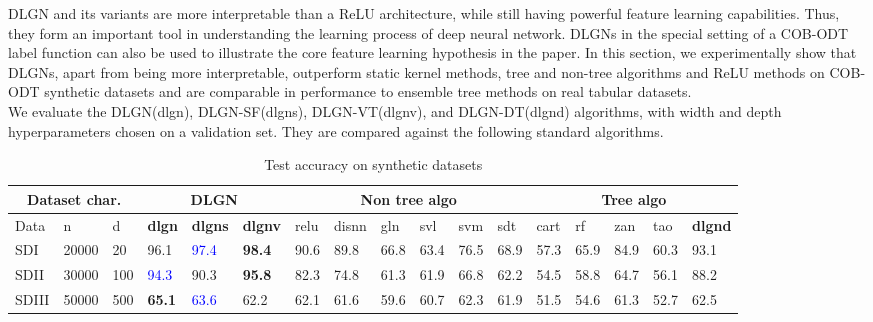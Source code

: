 \documentclass{article} %
\renewcommand{\>}{{\rightarrow}}
\renewcommand{\=}{\stackrel{\triangle}{=}}
\newcommand{\0}{{\mathbf 0}}
\begin{document}
DLGN and its variants are more interpretable than a ReLU architecture, while still having powerful feature learning capabilities. Thus, they form an important tool in understanding the learning process of deep neural network. DLGNs in the special setting of a COB-ODT label function can also be used to illustrate the core feature learning hypothesis in the paper. In this section, we experimentally show that DLGNs, apart from being more interpretable, outperform static kernel methods, tree and non-tree algorithms and ReLU methods on COB-ODT synthetic datasets and are comparable in performance to ensemble tree methods on real tabular datasets. \\

We evaluate the DLGN(dlgn), DLGN-SF(dlgns), DLGN-VT(dlgnv), and DLGN-DT(dlgnd) algorithms, with width and depth hyperparameters chosen on a validation set. They are compared against the following standard algorithms. 

\begin{table}[t]
\caption{Test accuracy on synthetic datasets}
\label{acc-cob-odts}
\begin{center}
\small
\begin{adjustbox}{width=0.99 \textwidth}
\begin{tabular}{|p{0.52cm}|p{0.6cm}|p{0.3cm}|p{0.4cm}|p{0.55cm}|p{0.55cm}|p{0.4cm}|p{0.5cm}|p{0.4cm}|p{0.4cm}|p{0.4cm}|p{0.4cm}|p{0.4cm}|p{0.4cm}|p{0.4cm}|p{0.4cm}|p{0.6cm}|}
\hline
\multicolumn{3}{|c|}{Dataset char.} &\multicolumn{3}{|c|}{DLGN} &\multicolumn{6}{|c|}{Non tree algo} &\multicolumn{5}{|c|}{Tree algo} \\
 \hline
 Data &n &d &\textbf{dlgn} &\textbf{dlgns} &\textbf{dlgnv} &relu &disnn &gln &svl &svm &sdt &cart &rf &zan &tao &\textbf{dlgnd}
\\ \hline
SDI    &20000 &20 &96.1 &\textcolor{blue}{97.4} &\textbf{98.4} &90.6 &89.8 &66.8 &63.4 &76.5 &68.9  &57.3 &65.9 &84.9 &60.3 &93.1\\
SDII   &30000 &100 &\textcolor{blue}{94.3} &90.3 &\textbf{95.8} &82.3 &74.8 &61.3 &61.9 &66.8  &62.2 &54.5  &58.8 &64.7 &56.1 &88.2\\
SDIII   &50000 &500 &\textbf{65.1} &\textcolor{blue}{63.6} &62.2 &62.1 &61.6 &59.6 &60.7 &62.3 &61.9 &51.5 &54.6 &61.3 &52.7 &62.5\\
\hline

\end{tabular}
\end{adjustbox}
\end{center}
\end{table}
\end{document}
